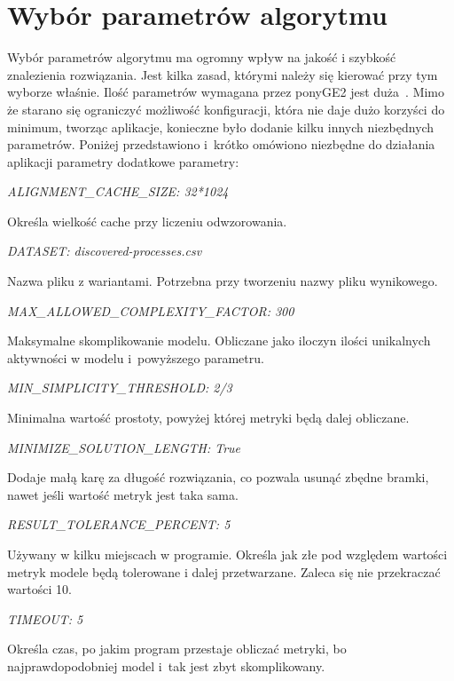 \section{Wybór parametrów algorytmu}
\label{sec:params}
Wybór parametrów algorytmu ma ogromny wpływ na jakość i szybkość znalezienia rozwiązania. Jest kilka zasad, którymi należy się kierować przy tym wyborze właśnie. Ilość parametrów wymagana przez ponyGE2 jest duża~\cite{PonyGE2-wiki}. Mimo że starano się ograniczyć możliwość konfiguracji, która nie daje dużo korzyści do minimum, tworząc aplikacje, konieczne było dodanie kilku innych niezbędnych parametrów. Poniżej przedstawiono i~krótko omówiono niezbędne do działania aplikacji parametry dodatkowe parametry: \newline
\begin{center}
\textit{ALIGNMENT\_CACHE\_SIZE:           32*1024}
\end{center}
Określa wielkość cache przy liczeniu odwzorowania.
\begin{center}
\textit{DATASET:                        discovered-processes.csv}
\end{center}
Nazwa pliku z wariantami. Potrzebna przy tworzeniu nazwy pliku wynikowego.
\begin{center}
\textit{MAX\_ALLOWED\_COMPLEXITY\_FACTOR:  300}
\end{center}
Maksymalne skomplikowanie modelu. Obliczane jako iloczyn ilości unikalnych aktywności w modelu i~powyższego parametru.
\begin{center}
\textit{MIN\_SIMPLICITY\_THRESHOLD:       2/3}
\end{center}
Minimalna wartość prostoty, powyżej której metryki będą dalej obliczane. 
\begin{center}
\textit{MINIMIZE\_SOLUTION\_LENGTH:       True}
\end{center}
Dodaje małą karę za długość rozwiązania, co pozwala usunąć zbędne bramki, nawet jeśli wartość metryk jest taka sama.
\begin{center}
\textit{RESULT\_TOLERANCE\_PERCENT:       5}
\end{center}
Używany w kilku miejscach w programie. Określa jak złe pod względem wartości metryk modele będą tolerowane i dalej przetwarzane. Zaleca się nie przekraczać wartości 10.
\begin{center}
\textit{TIMEOUT:                        5}
\end{center}
Określa czas, po jakim program przestaje obliczać metryki, bo najprawdopodobniej model i~tak jest zbyt skomplikowany.

